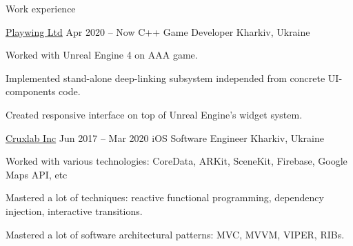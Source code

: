 \begin{rSection}{Work experience}
    \begin{rSubsection}
        {\href{https://playwing.com}{Playwing Ltd}
        }
        {Apr 2020 -- Now}
        {C++ Game Developer}
        {Kharkiv, Ukraine}
        \item Worked with Unreal Engine 4 on AAA game.
        \item Implemented stand-alone deep-linking subsystem independed from concrete UI-components code.
        \item Created responsive interface on top of Unreal Engine's widget system.
    \end{rSubsection}

    \begin{rSubsection}
        {\href{https://cruxlab.com/}{Cruxlab Inc}
        }
        {Jun 2017 -- Mar 2020}
        {iOS Software Engineer}
        {Kharkiv, Ukraine}

        \item Worked with various technologies: CoreData, ARKit, SceneKit, Firebase, Google Maps API, etc
        \item Mastered a lot of techniques: reactive functional programming, dependency injection, interactive transitions.
        \item Mastered a lot of software architectural patterns: MVC, MVVM, VIPER, RIBs.
    \end{rSubsection}
\end{rSection}
